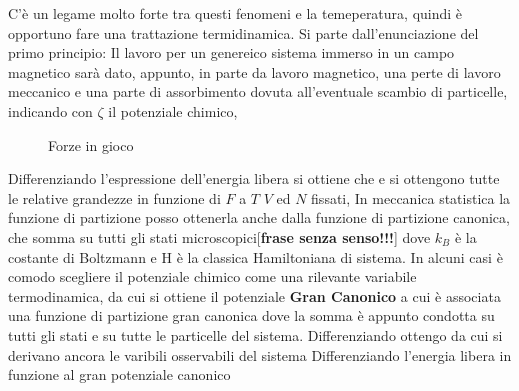 C'è un legame molto forte tra questi fenomeni e la temeperatura, quindi è opportuno fare una trattazione termidinamica. Si parte dall'enunciazione del primo principio:
Il lavoro per un genereico sistema immerso in un campo magnetico sarà dato, appunto, in parte da lavoro magnetico, una perte di lavoro meccanico e una parte di assorbimento dovuta all'eventuale scambio di particelle, indicando con $\zeta$ il potenziale chimico, 
\begin{figure}
	\usetikzlibrary{arrows}
	\centering
	\caption{Forze in gioco}
	\label{Lorenz}
\end{figure}
Differenziando l'espressione dell'energia libera si ottiene che
e si ottengono tutte le relative grandezze in funzione di $F$ a $T$ $V$ ed $N$ fissati,
In meccanica statistica la funzione di partizione posso ottenerla anche dalla funzione di partizione canonica, che somma su tutti gli stati microscopici[\textbf{frase senza senso!!!}]
dove $k_B$ è la costante di Boltzmann e H è la classica Hamiltoniana di sistema. In alcuni casi è comodo scegliere il potenziale chimico come una rilevante variabile termodinamica, da cui si ottiene il potenziale \textbf{Gran Canonico}
a cui è associata una funzione di partizione gran canonica
dove la somma è appunto condotta su tutti gli stati e su tutte le particelle del sistema. Differenziando ottengo
da cui si derivano ancora le varibili osservabili del sistema
Differenziando l'energia libera in funzione al gran potenziale canonico
